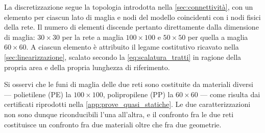 La discretizzazione segue la topologia introdotta nella \cref{sec:connettività}, con un elemento per ciascun lato di maglia e nodi del modello coincidenti con i nodi fisici della rete. Il numero di elementi discende pertanto direttamente dalla dimensione di maglia: $30\times30$ per la rete a maglia $100\times100$ e $50\times50$ per quella a maglia $60\times60$. A ciascun elemento è attribuito il legame costitutivo ricavato nella \cref{sec:linearizzazione}, scalato secondo la \eqref{eq:scalatura_tratti} in ragione della propria area e della propria lunghezza di riferimento.

Si osservi che le funi di maglia delle due reti sono costituite da materiali diversi — polietilene (PE) la $100\times100$, polipropilene (PP) la $60\times60$ — come risulta dai certificati riprodotti nella \cref{app:prove_quasi_statiche}. Le due caratterizzazioni non sono dunque riconducibili l'una all'altra, e il confronto fra le due reti costituisce un confronto fra due materiali oltre che fra due geometrie.


